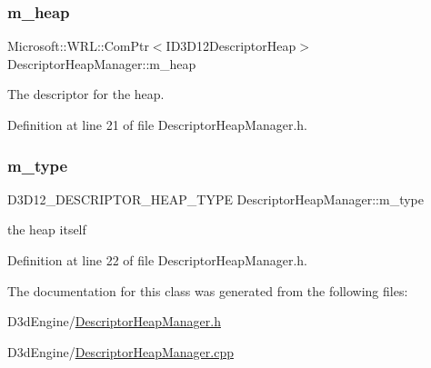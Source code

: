 \subsubsection{\texorpdfstring{m\+\_\+heap}{m\_heap}}
{\footnotesize\ttfamily Microsoft\+::\+W\+R\+L\+::\+Com\+Ptr$<$I\+D3\+D12\+Descriptor\+Heap$>$ Descriptor\+Heap\+Manager\+::m\+\_\+heap\hspace{0.3cm}{\ttfamily [private]}}



The descriptor for the heap. 



Definition at line 21 of file Descriptor\+Heap\+Manager.\+h.

\mbox{\label{class_descriptor_heap_manager_a97dc1db0ffbcb980be70180fdd3e97dd}} 
\subsubsection{\texorpdfstring{m\+\_\+type}{m\_type}}
{\footnotesize\ttfamily D3\+D12\+\_\+\+D\+E\+S\+C\+R\+I\+P\+T\+O\+R\+\_\+\+H\+E\+A\+P\+\_\+\+T\+Y\+PE Descriptor\+Heap\+Manager\+::m\+\_\+type\hspace{0.3cm}{\ttfamily [private]}}



the heap itself 



Definition at line 22 of file Descriptor\+Heap\+Manager.\+h.



The documentation for this class was generated from the following files\+:\begin{DoxyCompactItemize}
\item 
D3d\+Engine/\mbox{\hyperlink{_descriptor_heap_manager_8h}{Descriptor\+Heap\+Manager.\+h}}\item 
D3d\+Engine/\mbox{\hyperlink{_descriptor_heap_manager_8cpp}{Descriptor\+Heap\+Manager.\+cpp}}\end{DoxyCompactItemize}
